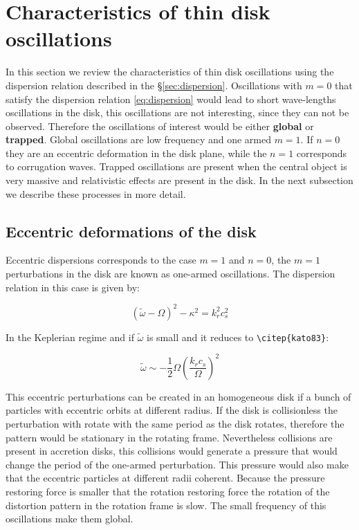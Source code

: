 \section*{Characteristics of thin disk oscillations}

In this section we review the characteristics of thin disk
oscillations using the dispersion relation described in the
\S \ref{sec:dispersion}. Oscillations with $m=0$ that satisfy
the dispersion relation \ref{eq:dispersion} would lead to short
wave-lengths oscillations in the disk, this oscillations are not 
interesting, since they can not be observed. Therefore the
oscillations of interest would be either \textbf{global} or
\textbf{trapped}. Global oscillations are low frequency and
one armed $m=1$. If $n=0$ they are an eccentric deformation in the
disk plane, while the $n=1$ corresponds to corrugation waves.
Trapped oscillations are present when the central object is very
massive and relativistic effects are present in the disk.
In the next subsection we describe these processes in more detail.

\subsection*{Eccentric deformations of the disk}

Eccentric dispersions corresponds to the case $m=1$ and $n=0$,
the $m = 1$ perturbations in the disk are known as one-armed
oscillations. The dispersion relation in this case is given by:

\begin{equation}
(\tilde{\omega} - \Omega)^2 - \kappa^2 = k_r^2c_s^2
\end{equation}

In the Keplerian regime and if $\tilde{\omega}$ is small and it reduces to
\verb+\citep{kato83}+:

\begin{equation}
\tilde{\omega} \sim - \dfrac{1}{2} \Omega \left( \dfrac{k_r
c_s}{\Omega}\right)^2
\end{equation}

This eccentric perturbations can be created in an homogeneous disk
if a bunch of particles with eccentric orbits at different radius.
If the disk is collisionless the perturbation with rotate with the
same period as the disk rotates, therefore the pattern would be
stationary in the rotating frame. Nevertheless collisions are present
in accretion disks, this collisions would generate a pressure that
would change the period of the one-armed perturbation. This pressure would also
make that the eccentric particles at different radii coherent. Because
the pressure restoring force is smaller that the rotation restoring
force the rotation of the distortion pattern in the rotation frame is
slow. The small frequency of this oscillations make them global.

